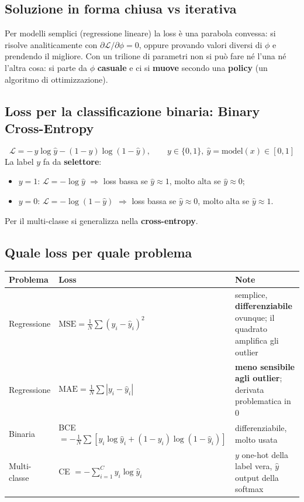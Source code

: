 \subsection{Soluzione in forma chiusa vs iterativa}
Per modelli semplici (regressione lineare) la loss è una parabola convessa: si risolve analiticamente con
$\partial\mathcal{L}/\partial\phi = 0$, oppure provando valori diversi di $\phi$ e prendendo il migliore. Con un trilione di
parametri non si può fare né l'una né l'altra cosa: si parte da $\phi$ \textbf{casuale} e ci si \textbf{muove} secondo
una \textbf{policy} (un algoritmo di ottimizzazione).

\subsection{Loss per la classificazione binaria: Binary Cross-Entropy}
\[
\mathcal{L} = -\,y\log\hat y - (1-y)\log(1-\hat y), \qquad y\in\{0,1\},\ \hat y = \text{model}(x)\in[0,1]
\]
La label $y$ fa da \textbf{selettore}:
\begin{itemize}
  \item $y=1$: $\mathcal{L} = -\log\hat y$ $\Rightarrow$ loss bassa se $\hat y\approx 1$, molto alta se $\hat y\approx 0$;
  \item $y=0$: $\mathcal{L} = -\log(1-\hat y)$ $\Rightarrow$ loss bassa se $\hat y\approx 0$, molto alta se $\hat y\approx 1$.
\end{itemize}
Per il multi-classe si generalizza nella \textbf{cross-entropy}.

\subsection{Quale loss per quale problema}\label{sec:quale-loss}
\begin{center}
\small
\renewcommand{\arraystretch}{1.4}
\begin{tabularx}{\textwidth}{l l X}
\toprule
\textbf{Problema} & \textbf{Loss} & \textbf{Note}\\
\midrule
Regressione & $\mathrm{MSE} = \frac1N\sum (y_i-\hat y_i)^2$ & semplice, \textbf{differenziabile} ovunque; il quadrato amplifica gli outlier\\
Regressione & $\mathrm{MAE} = \frac1N\sum |y_i-\hat y_i|$ & \textbf{meno sensibile agli outlier}; derivata problematica in 0\\
Binaria & BCE $= -\frac1N\sum [y_i\log\hat y_i + (1-y_i)\log(1-\hat y_i)]$ & differenziabile, molto usata\\
Multi-classe & CE $= -\sum_{i=1}^{C} y_i\log\hat y_i$ & $y$ one-hot della label vera, $\hat y$ output della softmax\\
\bottomrule
\end{tabularx}
\end{center}

